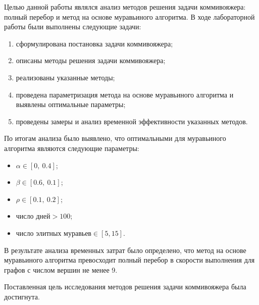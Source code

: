 
Целью данной работы являлся анализ методов решения задачи коммивояжера: полный перебор и метод на основе муравьиного алгоритма.
В ходе лабораторной работы были выполнены следующие задачи:
\begin{enumerate}[label={\arabic*)}]
	\item сформулирована постановка задачи коммивояжера;
	\item описаны методы решения задачи коммивояжера;
	\item реализованы указанные методы;
	\item проведена параметризация метода на основе муравьиного алгоритма и выявлены оптимальные параметры;
	\item проведены замеры и анализ временной эффективности указанных методов.
\end{enumerate}

По итогам анализа было выявлено, что оптимальными для муравьиного алгоритма являются следующие параметры:
\begin{itemize}
	\item $\alpha \in [0,\ 0.4]$;
	\item $\beta \in [0.6,\ 0.1]$;
	\item $\rho \in [0.1,\ 0.2]$;
	\item $\text{число дней} > 100$;
	\item $\text{число элитных муравьев} \in [5, 15]$.
\end{itemize}

В результате анализа временных затрат было определено, что метод на основе муравьиного алгоритма превосходит полный перебор в скорости выполнения для графов с числом вершин не менее 9.

Поставленная цель исследования методов решения задачи коммивояжера была достигнута.
\clearpage
